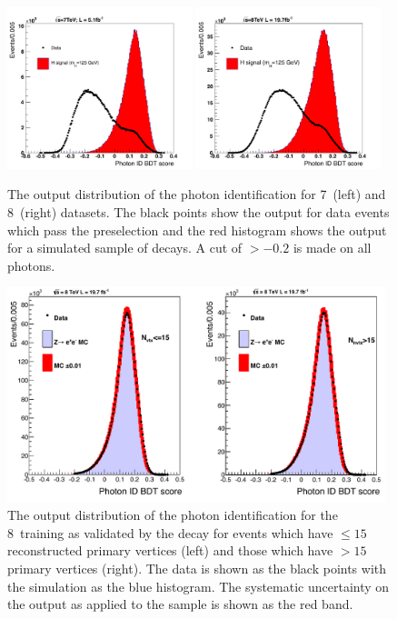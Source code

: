 \begin{figure}
  \includegraphics[width=0.48\textwidth]{selec_and_cats/plots/lowScoreID_7TeV_fix.pdf}
  \includegraphics[width=0.48\textwidth]{selec_and_cats/plots/lowScoreID_8TeV_fix.pdf}
  \caption[The output distribution of the photon identification \acs{BDT}]{The output distribution of the photon identification \BDT for 7~\TeV (left) and 8~\TeV (right) datasets. The black points show the output for data events which pass the preselection and the red histogram shows the output for a simulated \MC sample of \Hgg decays. A cut of $>-0.2$ is made on all photons.}
  \label{fig:photon_id_bdt}
\end{figure}

\begin{figure}
  \includegraphics[width=0.98\textwidth]{selec_and_cats/plots/idmva_nvtx_fix.pdf}
  \caption[The output distribution of the photon identification \acs{BDT} in \Zee decays]{The output distribution of the photon identification \BDT for the 8~\TeV training as validated by the \Zee decay for events which have $\leq15$ reconstructed primary vertices (left) and those which have $>15$ primary vertices (right). The data is shown as the black points with the \MC simulation as the blue histogram. The systematic uncertainty on the output as applied to the \MC sample is shown as the red band.}
  \label{fig:photon_id_zee}
\end{figure}

